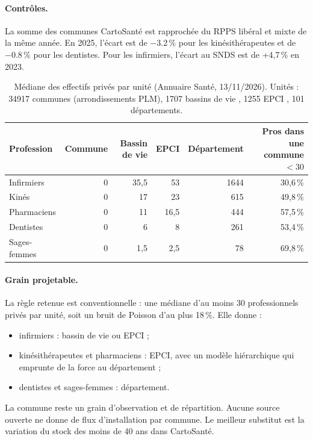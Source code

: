 \paragraph{Contrôles.} La somme des communes CartoSanté est rapprochée du RPPS libéral et mixte de la même année.
En 2025, l'écart est de \num{-3.2}\,\% pour les kinésithérapeutes et de \num{-0.8}\,\% pour les dentistes\mesure{}.
Pour les infirmiers, l'écart au SNDS est de +4,7\,\% en 2023\mesure{}.

\begin{table}[h]
\centering\small
\begin{tabular}{@{}lrrrrr@{}}
\toprule
Profession & Commune & Bassin de vie & EPCI & Département & Pros dans une commune $<30$ \\
\midrule
Infirmiers & 0 & 35,5 & 53 & \num{1644} & 30,6\,\% \\
Kinés & 0 & 17 & 23 & 615 & 49,8\,\% \\
Pharmaciens & 0 & 11 & 16,5 & 444 & 57,5\,\% \\
Dentistes & 0 & 6 & 8 & 261 & 53,4\,\% \\
Sages-femmes & 0 & 1,5 & 2,5 & 78 & 69,8\,\% \\
\bottomrule
\end{tabular}
\caption{Médiane des effectifs privés par unité (Annuaire Santé, 13/11/2026)\mesure{}. Unités : \num{34917}
communes (arrondissements PLM), \num{1707} bassins de vie \citep{a4-insee2026bv}, \num{1255} EPCI
\citep{a4-geoapi2026}, 101 départements.}
\label{a4-tab:grain}
\end{table}

\paragraph{Grain projetable.} La règle retenue est conventionnelle : une médiane d'au moins 30 professionnels
privés par unité, soit un bruit de Poisson d'au plus 18\,\%\derive{}. Elle donne :
\begin{itemize}
  \item infirmiers : bassin de vie ou EPCI ;
  \item kinésithérapeutes et pharmaciens : EPCI, avec un modèle hiérarchique qui emprunte de la force au
  département ;
  \item dentistes et sages-femmes : département.
\end{itemize}
La commune reste un grain d'observation et de répartition. Aucune source ouverte ne donne de flux d'installation
par commune. Le meilleur substitut est la variation du stock des moins de 40 ans dans CartoSanté.

